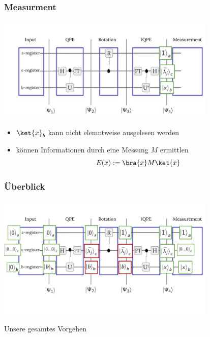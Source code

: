 \begin{frame}
    \frametitle{Measurment}
    \begin{center}
    \includegraphics[width=10.5cm]{img/hhl_circuit/hhl_circuit_4.jpg}
    \end{center}

    
    \begin{itemize}
        \item $\ket{x}_b$ kann nicht elemntweise ausgelesen werden
        \item können Informationen durch eine Messung $M$ ermittlen
        $$ E(x) := \bra{x}M\ket{x} $$

    \end{itemize}

\end{frame}

\begin{frame}
    \frametitle{Überblick}

    \begin{center}
    \includegraphics[width=10.5cm]{img/hhl_circuit/hhl_circuit_5.jpg}
    \end{center}
    Unsere gesamtes Vorgehen

    

\end{frame}


